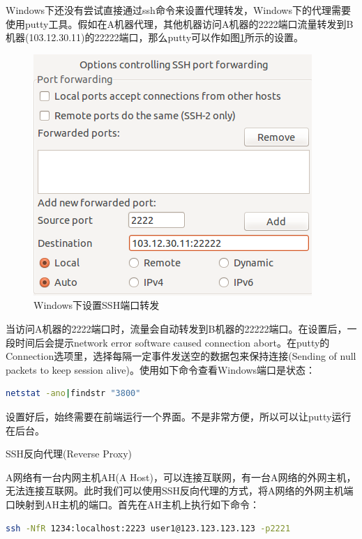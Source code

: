 \documentclass[12pt]{book}
\makeatletter
\numberwithin{dummy}{section}
\theoremstyle{ocrenumbox}
\theoremstyle{blacknumex}
\theoremstyle{blacknumbox}
\theoremstyle{ocrenum}
\renewcommand\paragraph{\@startsection{paragraph}{4}{\z@}
	{-2ex \@plus-.2ex \@minus .2ex}
	{.1ex}
	{\normalfont\small\sffamily\bfseries}}
\makeatother
\begin{document}
Windows下还没有尝试直接通过ssh命令来设置代理转发，Windows下的代理需要使用putty工具。假如在A机器代理，其他机器访问A机器的2222端口流量转发到B机器(103.12.30.11)的22222端口，那么putty可以作如图\ref{fig:puttyportforwarding}所示的设置。

\begin{figure}[htbp]
	\centering
	\includegraphics[scale=0.6]{puttyportforwarding.png}
	\caption{Windows下设置SSH端口转发}
	\label{fig:puttyportforwarding}
\end{figure}

当访问A机器的2222端口时，流量会自动转发到B机器的22222端口。在设置后，一段时间后会提示network error software caused connection abort。在putty的Connection选项里，选择每隔一定事件发送空的数据包来保持连接(Sending of null packets to keep session alive)。使用如下命令查看Windows端口是状态：

\begin{lstlisting}[language=Bash]
netstat -ano|findstr "3800"
\end{lstlisting}

设置好后，始终需要在前端运行一个界面。不是非常方便，所以可以让putty运行在后台。


\paragraph{SSH反向代理(Reverse Proxy)}

A网络有一台内网主机AH(A Host)，可以连接互联网，有一台A网络的外网主机，无法连接互联网。此时我们可以使用SSH反向代理的方式，将A网络的外网主机端口映射到AH主机的端口。首先在AH主机上执行如下命令：

\begin{lstlisting}[language=Bash]
ssh -NfR 1234:localhost:2223 user1@123.123.123.123 -p2221
\end{lstlisting}
\end{document}
